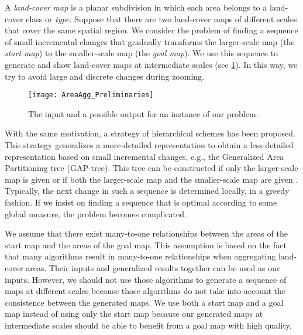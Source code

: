\documentclass[acmsmall,natbib=false]{acmart}
\begin{document}
A \emph{land-cover map} is a planar subdivision in which 
each area belongs to a land-cover class or \emph{type}.
Suppose that there are two land-cover maps of different scales 
that cover the same spatial region.
We consider the problem of finding a sequence 
of small incremental changes that gradually transforms 
the larger-scale map (the \emph{start map}) to 
the smaller-scale map (the \emph{goal map}).
We use this sequence to generate and show land-cover maps at 
intermediate scales (see \fig\ref{fig:AreaAgg_example}).
In this way, we try to avoid large and discrete changes
during zooming.

\begin{figure}[tb]
\centering
\texttt{[image: AreaAgg\_Preliminaries]}
\caption{The input and a possible output for an instance of 
our problem.}
\label{fig:AreaAgg_example}
\end{figure}

With the same motivation, 
a strategy of hierarchical schemes has been proposed.
This strategy generalizes a more-detailed representation 
to obtain a less-detailed representation 
based on small incremental changes, 
e.g., the Generalized Area Partitioning tree (GAP-tree).
This tree can be constructed if only the larger-scale map is given
\citep{vanOosterom2005} 
or if both the larger-scale map and the smaller-scale map 
are given \citep{HaunertDilo2009}.
Typically, the next change in such a sequence 
is determined locally, in a greedy fashion.  
If we insist on finding a sequence that is optimal 
according to some global measure,
the problem becomes complicated.



We assume that there exist many-to-one relationships 
between the areas of the start map and the areas of the goal map.
This assumption is based on the fact that many algorithms 
\parencite[e.g.,][]{HaunertWolff2010AreaAgg,
vanSmaalen2003,Oehrlein2017Aggregation}
result in many-to-one relationships
when aggregating land-cover areas.
Their inputs and generalized results together
can be used as our inputs.
However, we should not use those algorithms
to generate a sequence of maps at different scales
because those algorithms do not take into account 
the consistence between the generated maps.
We use both a start map and a goal map instead of using only the start map
because our generated maps at intermediate scales should be able to
benefit from a goal map with high quality.
\end{document}
